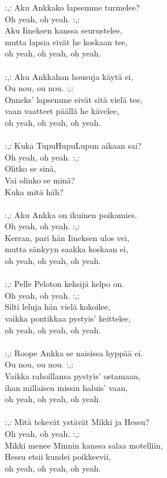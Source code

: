
:,: Aku Ankkako lapsemme turmelee? \\ Oh yeah, oh yeah. :,: \\ Aku Iineksen kanssa seurustelee,  \\ mutta lapsia eivät he koskaan tee,  \\ oh yeah, oh yeah, oh yeah. \\ \hspace{10mm} \\ :,: Aku Ankkahan housuja käytä ei,  \\ Ou nou, ou nou. :,: \\ Onneks' lapsemme eivät sitä vielä tee,  \\ vaan vaatteet päällä he kävelee, \\ oh yeah, oh yeah, oh yeah. \\ \hspace{10mm} \\ :,: Kuka TupuHupuLupun aikaan sai?  \\ Oh yeah, oh yeah. :,: \\ Olitko se sinä,  \\ Vai olinko se minä?  \\ Kuka mitä häh? \\ \hspace{10mm} \\ :,: Aku Ankka on ikuinen poikamies.  \\ Oh yeah, oh yeah. :,: \\ Kerran, pari hän Iineksen ulos vei,  \\ mutta sänkyyn saakka koskaan ei,  \\ oh yeah, oh yeah, oh yeah.  \\ \hspace{10mm} \\ :,: Pelle Peloton keksijä kelpo on.  \\ Oh yeah, oh yeah. :,: \\ Silti leluja hän vielä kokoilee,  \\ vaikka pontikkaa pystyis' keittelee, \\ oh yeah, oh yeah, oh yeah.  \\ \hspace{10mm} \\ :,: Roope Ankka se naisissa hyppää ei.  \\ Ou nou, ou nou. :,: \\ Vaikka rahoillansa pystyis' ostamaan,  \\ ihan millaisen missin haluis' vaan,  \\ oh yeah, oh yeah, oh yeah. \\ \hspace{10mm} \\ :,: Mitä tekevät ystävät Mikki ja Hessu?   \\ Oh yeah, oh yeah. :,: \\ Mikki menee Minnin kanssa salaa motelliin,  \\ Hessu etsii kundei poikkeevii,  \\ oh yeah, oh yeah, oh yeah. \\ 